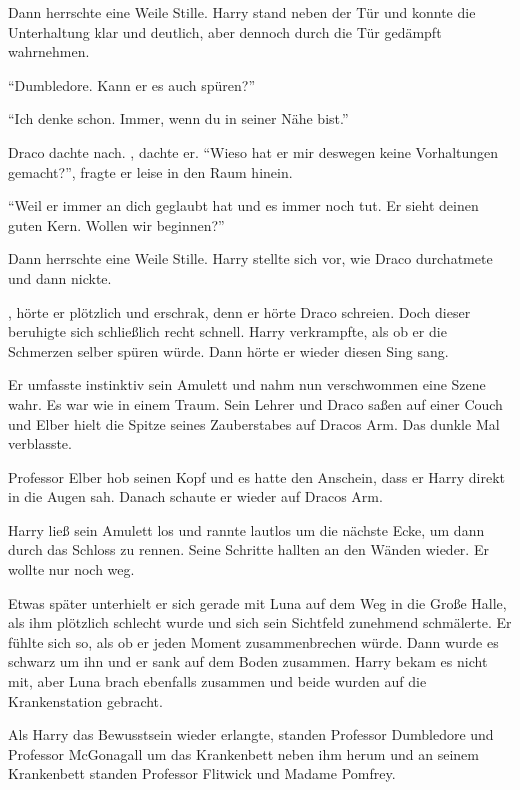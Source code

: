 Dann herrschte eine Weile Stille. Harry stand neben der Tür und konnte die Unterhaltung klar und deutlich, aber dennoch durch die Tür gedämpft wahrnehmen. 

\enquote{Dumbledore. Kann er es auch spüren?}

\enquote{Ich denke schon. Immer, wenn du in seiner Nähe bist.}

Draco dachte nach. , dachte er. \enquote{Wieso hat er mir deswegen keine Vorhaltungen gemacht?}, fragte er leise in den Raum hinein.

\enquote{Weil er immer an dich geglaubt hat und es immer noch tut. Er sieht deinen guten Kern. \gst Wollen wir beginnen?}

Dann herrschte eine Weile Stille. Harry stellte sich vor, wie Draco durchatmete und dann nickte.

, hörte er plötzlich und erschrak, denn er hörte Draco schreien. Doch dieser beruhigte sich schließlich recht schnell. Harry verkrampfte, als ob er die Schmerzen selber spüren würde. Dann hörte er wieder diesen Sing sang. 

Er umfasste instinktiv sein Amulett und nahm nun verschwommen eine Szene wahr. Es war wie in einem Traum. Sein Lehrer und Draco saßen auf einer Couch und Elber hielt die Spitze seines Zauberstabes auf Dracos Arm. Das dunkle Mal verblasste.

Professor Elber hob seinen Kopf und es hatte den Anschein, dass er Harry direkt in die Augen sah. Danach schaute er wieder auf Dracos Arm. 

Harry ließ sein Amulett los und rannte lautlos um die nächste Ecke, um dann durch das Schloss zu rennen. Seine Schritte hallten an den Wänden wieder. Er wollte nur noch weg.

Etwas später unterhielt er sich gerade mit Luna auf dem Weg in die Große Halle, als ihm plötzlich schlecht wurde und sich sein Sichtfeld zunehmend schmälerte. Er fühlte sich so, als ob er jeden Moment zusammenbrechen würde. Dann wurde es schwarz um ihn und er sank auf dem Boden zusammen. Harry bekam es nicht mit, aber Luna brach ebenfalls zusammen und beide wurden auf die Krankenstation gebracht.

Als Harry das Bewusstsein wieder erlangte, standen Professor Dumbledore und Professor McGonagall um das Krankenbett neben ihm herum und an seinem Krankenbett standen Professor Flitwick und Madame Pomfrey.

